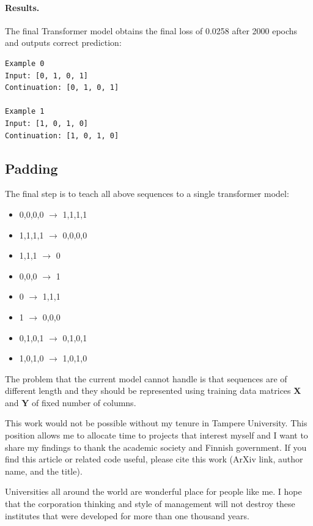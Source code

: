 \documentclass[final]{article}
\begin{document}
\paragraph{Results.} The final Transformer model obtains the final loss of 0.0258 after 2000 epochs and outputs correct prediction:
\begin{verbatim}
Example 0
Input: [0, 1, 0, 1]
Continuation: [0, 1, 0, 1]

Example 1
Input: [1, 0, 1, 0]
Continuation: [1, 0, 1, 0]
\end{verbatim}

\subsection{Padding}
The final step is to teach all above sequences to a single transformer model:
\begin{itemize}
  \item 0,0,0,0 $\rightarrow$ 1,1,1,1
  \item 1,1,1,1 $\rightarrow$ 0,0,0,0
  \item   1,1,1 $\rightarrow$ 0
  \item   0,0,0 $\rightarrow$ 1
  \item       0 $\rightarrow$ 1,1,1
  \item       1 $\rightarrow$ 0,0,0
  \item 0,1,0,1 $\rightarrow$ 0,1,0,1
  \item 1,0,1,0 $\rightarrow$ 1,0,1,0
\end{itemize}
The problem that the current model cannot handle is that sequences are of different length and they should be represented using training data matrices $\mathbf{X}$ and $\mathbf{Y}$ of fixed number of columns. 

\begin{ack}
This work would not be possible without my tenure in Tampere
University. This position allows me to allocate time to projects
that interest myself and I want to share my findings to thank the
academic society and Finnish government. If you find this article or
related code useful, please cite this work (ArXiv link, author name,
and the title).

Universities all around the world are wonderful place for people like
me. I hope that the corporation thinking and style of management will
not destroy these institutes that were developed for more than one
thousand years.
\end{ack}

\printbibliography
\end{document}
